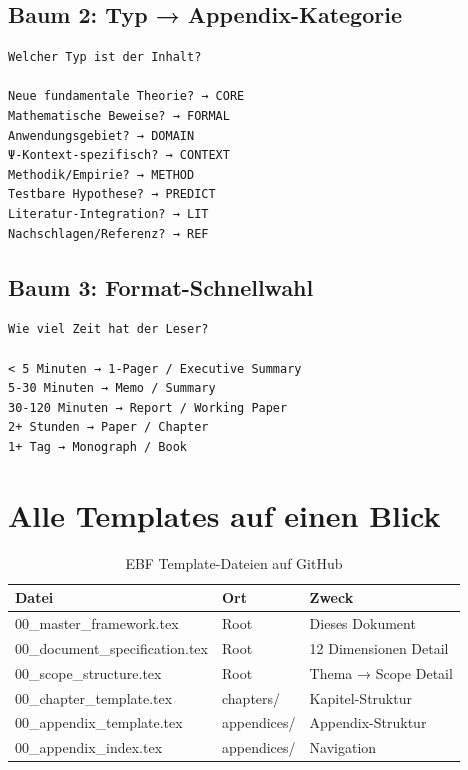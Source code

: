 \documentclass[12pt,a4paper]{article}
\begin{document}
\subsection{Baum 2: Typ → Appendix-Kategorie}

\begin{verbatim}
Welcher Typ ist der Inhalt?

Neue fundamentale Theorie? → CORE
Mathematische Beweise? → FORMAL
Anwendungsgebiet? → DOMAIN
Ψ-Kontext-spezifisch? → CONTEXT
Methodik/Empirie? → METHOD
Testbare Hypothese? → PREDICT
Literatur-Integration? → LIT
Nachschlagen/Referenz? → REF
\end{verbatim}

\subsection{Baum 3: Format-Schnellwahl}

\begin{verbatim}
Wie viel Zeit hat der Leser?

< 5 Minuten → 1-Pager / Executive Summary
5-30 Minuten → Memo / Summary
30-120 Minuten → Report / Working Paper
2+ Stunden → Paper / Chapter
1+ Tag → Monograph / Book
\end{verbatim}


\section{Alle Templates auf einen Blick}

\begin{table}[htbp]
\centering
\caption{EBF Template-Dateien auf GitHub}
\renewcommand{\arraystretch}{1.3}
\begin{tabular}{@{}lll@{}}
\toprule
\textbf{Datei} & \textbf{Ort} & \textbf{Zweck} \\
\midrule
00\_master\_framework.tex & Root & Dieses Dokument \\
00\_document\_specification.tex & Root & 12 Dimensionen Detail \\
00\_scope\_structure.tex & Root & Thema → Scope Detail \\
00\_chapter\_template.tex & chapters/ & Kapitel-Struktur \\
00\_appendix\_template.tex & appendices/ & Appendix-Struktur \\
00\_appendix\_index.tex & appendices/ & Navigation \\
\bottomrule
\end{tabular}
\end{table}
\end{document}
